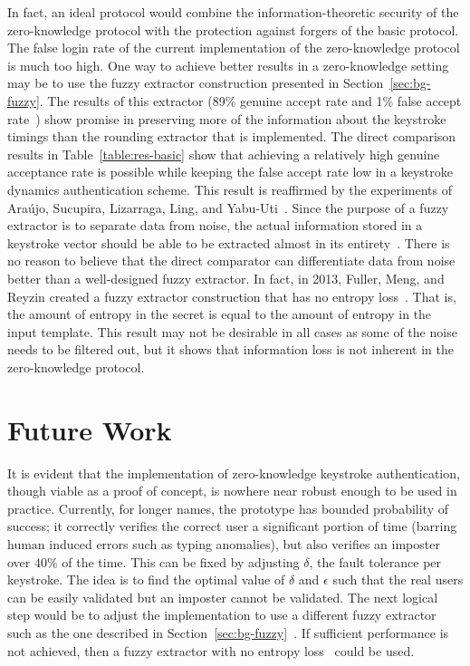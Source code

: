 \documentclass[11pt]{article}
\begin{document}
In fact, an ideal protocol would combine the information-theoretic security of the zero-knowledge protocol with the protection against forgers of the basic protocol. The false login rate of the current implementation of the zero-knowledge protocol is much too high. One way to achieve better results in a zero-knowledge setting may be to use the fuzzy extractor construction presented in Section~\ref{sec:bg-fuzzy}. The results of this extractor (89\% genuine accept rate and 1\% false accept rate~\cite{conf/csreaSAM/AlvarezEA09}) show promise in preserving more of the information about the keystroke timings than the rounding extractor that is implemented. The direct comparison results in Table~\ref{table:res-basic} show that achieving a relatively high genuine acceptance rate is possible while keeping the false accept rate low in a keystroke dynamics authentication scheme. This result is reaffirmed by the experiments of Ara\'ujo, Sucupira, Lizarraga, Ling, and Yabu-Uti~\cite{Araujo:2005:UAT:2197882.2199456}. Since the purpose of a fuzzy extractor is to separate data from noise, the actual information stored in a keystroke vector should be able to be extracted almost in its entirety~\cite{conf/csreaSAM/AlvarezEA09}. There is no reason to believe that the direct comparator can differentiate data from noise better than a well-designed fuzzy extractor. In fact, in 2013, Fuller, Meng, and Reyzin created a fuzzy extractor construction that has no entropy loss~\cite{cryptoeprint:2013:416}. That is, the amount of entropy in the secret is equal to the amount of entropy in the input template. This result may not be desirable in all cases as some of the noise needs to be filtered out, but it shows that information loss is not inherent in the zero-knowledge protocol.

\section{Future Work}
\label{sec:future}
It is evident that the implementation of zero-knowledge keystroke authentication, though viable as a proof of concept, is nowhere near robust enough to be used in practice. Currently, for longer names, the prototype has bounded probability of success; it correctly verifies the correct user a significant portion of time (barring human induced errors such as typing anomalies), but also verifies an imposter over $40\%$ of the time.  This can be fixed by adjusting $\delta$, the fault tolerance per keystroke. The idea is to find the optimal value of $\delta$ and $\epsilon$ such that the real users can be easily validated but an imposter cannot be validated. The next logical step would be to adjust the implementation to use a different fuzzy extractor such as the one described in Section~\ref{sec:bg-fuzzy}~\cite{Araujo:2005:UAT:2197882.2199456}. If sufficient performance is not achieved, then a fuzzy extractor with no entropy loss~\cite{cryptoeprint:2013:416} could be used.
\end{document}
